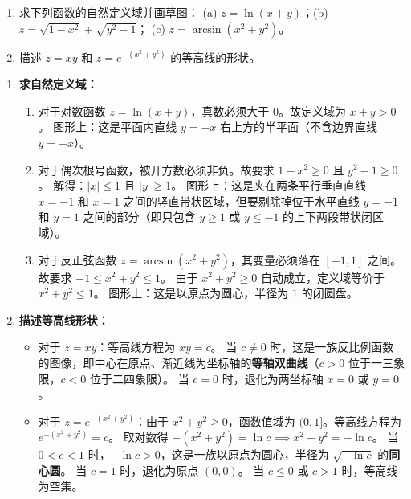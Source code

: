 \documentclass[lang=cn,11pt]{elegantbook}
\begin{document}
\begin{exercise}[基础：定义域与图像]
\begin{enumerate}
  \item[(1)] 求下列函数的自然定义域并画草图：
        (a) $z=\ln(x+y)$；(b) $z=\sqrt{1-x^2}+\sqrt{y^2-1}$；
        (c) $z=\arcsin(x^2+y^2)$。
  \item[(2)] 描述 $z=xy$ 和 $z=e^{-(x^2+y^2)}$ 的等高线的形状。
\end{enumerate}
\end{exercise}
\begin{solution}
\begin{enumerate}
  \item[(1)] \textbf{求自然定义域：}
  \begin{enumerate}
    \item[(a)] 对于对数函数 $z=\ln(x+y)$，真数必须大于 $0$。故定义域为 $x+y>0$。
    图形上：这是平面内直线 $y=-x$ 右上方的半平面（不含边界直线 $y=-x$）。
    \item[(b)] 对于偶次根号函数，被开方数必须非负。故要求 $1-x^2 \geq 0$ 且 $y^2-1 \geq 0$。
    解得：$|x| \leqslant  1$ 且 $|y| \geq 1$。
    图形上：这是夹在两条平行垂直直线 $x=-1$ 和 $x=1$ 之间的竖直带状区域，但要剔除掉位于水平直线 $y=-1$ 和 $y=1$ 之间的部分（即只包含 $y\geq 1$ 或 $y\leqslant  -1$ 的上下两段带状闭区域）。
    \item[(c)] 对于反正弦函数 $z=\arcsin(x^2+y^2)$，其变量必须落在 $[-1, 1]$ 之间。故要求 $-1 \leqslant  x^2+y^2 \leqslant  1$。
    由于 $x^2+y^2 \geq 0$ 自动成立，定义域等价于 $x^2+y^2 \leqslant  1$。
    图形上：这是以原点为圆心，半径为 $1$ 的闭圆盘。
  \end{enumerate}
  \item[(2)] \textbf{描述等高线形状：}
  \begin{itemize}
    \item 对于 $z=xy$：等高线方程为 $xy=c$。
    当 $c \neq 0$ 时，这是一族反比例函数的图像，即中心在原点、渐近线为坐标轴的\textbf{等轴双曲线}（$c>0$ 位于一三象限，$c<0$ 位于二四象限）。
    当 $c=0$ 时，退化为两坐标轴 $x=0$ 或 $y=0$。
    \item 对于 $z=e^{-(x^2+y^2)}$：由于 $x^2+y^2 \geq 0$，函数值域为 $(0, 1]$。等高线方程为 $e^{-(x^2+y^2)}=c$。
    取对数得 $-(x^2+y^2)=\ln c \implies x^2+y^2 = -\ln c$。
    当 $0<c<1$ 时，$-\ln c > 0$，这是一族以原点为圆心，半径为 $\sqrt{-\ln c}$ 的\textbf{同心圆}。
    当 $c=1$ 时，退化为原点 $(0,0)$。
    当 $c\leqslant  0$ 或 $c>1$ 时，等高线为空集。
  \end{itemize}
\end{enumerate}
\end{solution}
\end{document}
